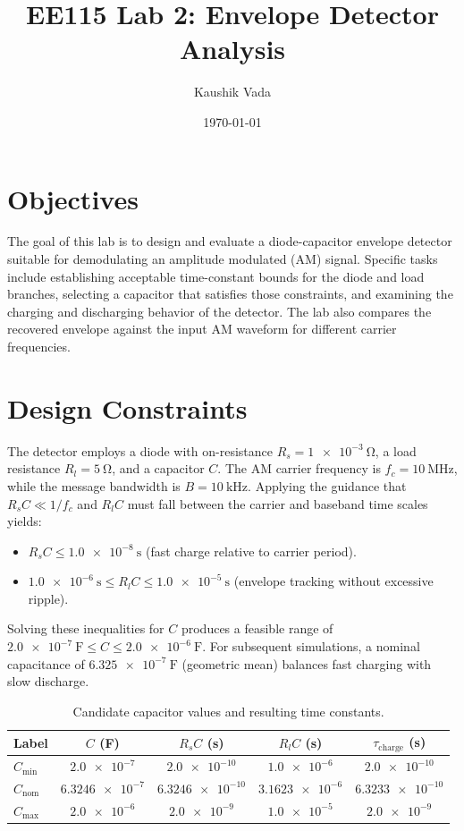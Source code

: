 \documentclass[12pt]{article}
\begin{document}
\title{EE115 Lab 2: Envelope Detector Analysis}
\author{Kaushik Vada}
\date{\today}
\maketitle

\section*{Objectives}
The goal of this lab is to design and evaluate a diode-capacitor envelope detector suitable for demodulating an amplitude modulated (AM) signal. Specific tasks include establishing acceptable time-constant bounds for the diode and load branches, selecting a capacitor that satisfies those constraints, and examining the charging and discharging behavior of the detector. The lab also compares the recovered envelope against the input AM waveform for different carrier frequencies.

\clearpage
\section*{Design Constraints}
The detector employs a diode with on-resistance $R_s = \SI{1e-3}{\ohm}$, a load resistance $R_l = \SI{5}{\ohm}$, and a capacitor $C$. The AM carrier frequency is $f_c = \SI{10}{\mega\hertz}$, while the message bandwidth is $B = \SI{10}{\kilo\hertz}$. Applying the guidance that $R_s C \ll 1/f_c$ and $R_l C$ must fall between the carrier and baseband time scales yields:
\begin{itemize}
    \item $R_s C \leq \SI{1.0e-8}{\second}$ (fast charge relative to carrier period).
    \item $\SI{1.0e-6}{\second} \leq R_l C \leq \SI{1.0e-5}{\second}$ (envelope tracking without excessive ripple).
\end{itemize}

Solving these inequalities for $C$ produces a feasible range of $\SI{2.0e-7}{\farad} \leq C \leq \SI{2.0e-6}{\farad}$. For subsequent simulations, a nominal capacitance of $\SI{6.325e-7}{\farad}$ (geometric mean) balances fast charging with slow discharge.

\begin{table}[H]
    \centering
    \caption{Candidate capacitor values and resulting time constants.}
    \begin{tabular}{@{}lcccc@{}}
        \toprule
        Label & $C$ (F) & $R_sC$ (s) & $R_lC$ (s) & $\tau_\text{charge}$ (s) \\
        \midrule
        $C_\text{min}$ & $\num{2.0e-7}$ & $\num{2.0e-10}$ & $\num{1.0e-6}$ & $\num{2.0e-10}$ \\
        $C_\text{nom}$ & $\num{6.3246e-7}$ & $\num{6.3246e-10}$ & $\num{3.1623e-6}$ & $\num{6.3233e-10}$ \\
        $C_\text{max}$ & $\num{2.0e-6}$ & $\num{2.0e-9}$ & $\num{1.0e-5}$ & $\num{2.0e-9}$ \\
        \bottomrule
    \end{tabular}
\end{table}
\end{document}
